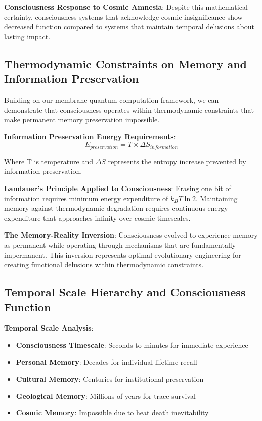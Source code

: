 \documentclass[12pt]{article}
\begin{document}
{\textbf{Consciousness Response to Cosmic Amnesia}: Despite this mathematical certainty, consciousness systems that acknowledge cosmic insignificance show decreased function compared to systems that maintain temporal delusions about lasting impact.

\subsection{Thermodynamic Constraints on Memory and Information Preservation}

Building on our membrane quantum computation framework, we can demonstrate that consciousness operates within thermodynamic constraints that make permanent memory preservation impossible.

\textbf{Information Preservation Energy Requirements}:
$$E_{preservation} = T \times \Delta S_{information}$$

Where T is temperature and $\Delta S$ represents the entropy increase prevented by information preservation.

\textbf{Landauer's Principle Applied to Consciousness}: Erasing one bit of information requires minimum energy expenditure of $k_B T \ln 2$. Maintaining memory against thermodynamic degradation requires continuous energy expenditure that approaches infinity over cosmic timescales.

\textbf{The Memory-Reality Inversion}: Consciousness evolved to experience memory as permanent while operating through mechanisms that are fundamentally impermanent. This inversion represents optimal evolutionary engineering for creating functional delusions within thermodynamic constraints.

\subsection{Temporal Scale Hierarchy and Consciousness Function}

\textbf{Temporal Scale Analysis}:
\begin{itemize}
\item \textbf{Consciousness Timescale}: Seconds to minutes for immediate experience
\item \textbf{Personal Memory}: Decades for individual lifetime recall
\item \textbf{Cultural Memory}: Centuries for institutional preservation
\item \textbf{Geological Memory}: Millions of years for trace survival
\item \textbf{Cosmic Memory}: Impossible due to heat death inevitability
\end{itemize}

}
\end{document}
